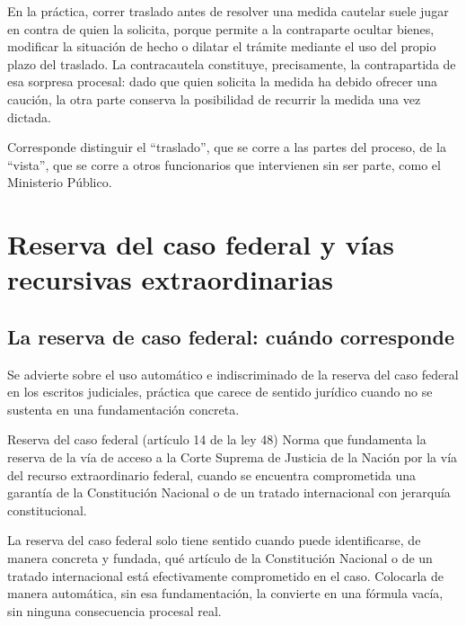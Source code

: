 \documentclass[12pt,oneside]{book}
\begin{document}
En la práctica, correr traslado antes de resolver una medida cautelar suele jugar en contra de quien la solicita, porque permite a la contraparte ocultar bienes, modificar la situación de hecho o dilatar el trámite mediante el uso del propio plazo del traslado. La contracautela constituye, precisamente, la contrapartida de esa sorpresa procesal: dado que quien solicita la medida ha debido ofrecer una caución, la otra parte conserva la posibilidad de recurrir la medida una vez dictada.

\begin{note}
Corresponde distinguir el ``traslado'', que se corre a las partes del proceso, de la ``vista'', que se corre a otros funcionarios que intervienen sin ser parte, como el Ministerio Público.
\end{note}

\chapter[Reserva del caso federal y recursos extraordinarios]{Reserva del caso federal y vías recursivas extraordinarias}

\section{La reserva de caso federal: cuándo corresponde}

Se advierte sobre el uso automático e indiscriminado de la reserva del caso federal en los escritos judiciales, práctica que carece de sentido jurídico cuando no se sustenta en una fundamentación concreta.

\begin{definition}{Reserva del caso federal (artículo 14 de la ley 48)}
Norma que fundamenta la reserva de la vía de acceso a la Corte Suprema de Justicia de la Nación por la vía del recurso extraordinario federal, cuando se encuentra comprometida una garantía de la Constitución Nacional o de un tratado internacional con jerarquía constitucional.
\end{definition}

\begin{important}
La reserva del caso federal solo tiene sentido cuando puede identificarse, de manera concreta y fundada, qué artículo de la Constitución Nacional o de un tratado internacional está efectivamente comprometido en el caso. Colocarla de manera automática, sin esa fundamentación, la convierte en una fórmula vacía, sin ninguna consecuencia procesal real.
\end{important}
\end{document}

